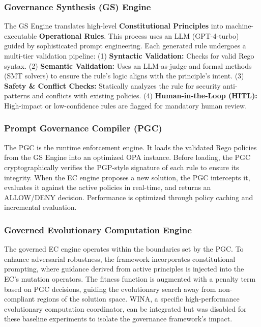\documentclass[10pt,twocolumn]{article}
\theoremstyle{definition}
\begin{document}
\subsubsection{Governance Synthesis (GS) Engine}
The GS Engine translates high-level \textbf{Constitutional Principles} into machine-executable \textbf{Operational Rules}. This process uses an LLM (GPT-4-turbo) guided by sophisticated prompt engineering. Each generated rule undergoes a multi-tier validation pipeline:
(1) \textbf{Syntactic Validation:} Checks for valid Rego syntax.
(2) \textbf{Semantic Validation:} Uses an LLM-as-judge and formal methods (SMT solvers) to ensure the rule's logic aligns with the principle's intent.
(3) \textbf{Safety \& Conflict Checks:} Statically analyzes the rule for security anti-patterns and conflicts with existing policies.
(4) \textbf{Human-in-the-Loop (HITL):} High-impact or low-confidence rules are flagged for mandatory human review.

\subsubsection{Prompt Governance Compiler (PGC)}
The PGC is the runtime enforcement engine. It loads the validated Rego policies from the GS Engine into an optimized OPA instance. Before loading, the PGC cryptographically verifies the PGP-style signature of each rule to ensure its integrity. When the EC engine proposes a new solution, the PGC intercepts it, evaluates it against the active policies in real-time, and returns an ALLOW/DENY decision. Performance is optimized through policy caching and incremental evaluation.

\subsubsection{Governed Evolutionary Computation Engine}
The governed EC engine operates within the boundaries set by the PGC. To enhance adversarial robustness, the framework incorporates constitutional prompting, where guidance derived from active principles is injected into the EC's mutation operators. The fitness function is augmented with a penalty term based on PGC decisions, guiding the evolutionary search away from non-compliant regions of the solution space. WINA, a specific high-performance evolutionary computation coordinator, can be integrated but was disabled for these baseline experiments to isolate the governance framework's impact.

\end{document}
